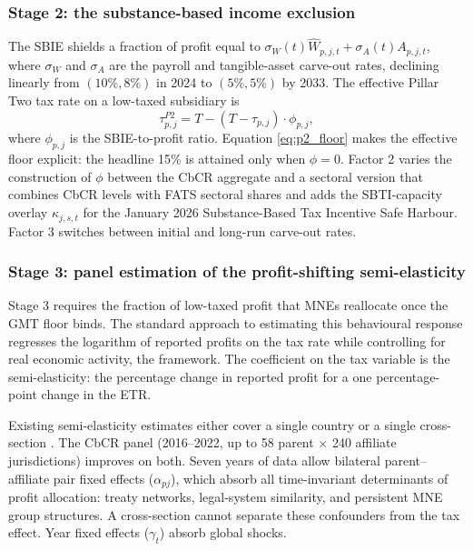 \documentclass[11pt,a4paper]{article}
\begin{document}
\subsubsection{Stage 2: the substance-based income exclusion}\label{sec:stage2}

The SBIE shields a fraction of profit equal to $\sigma_W(t) \hat{W}_{p,j,t} + \sigma_A(t) A_{p,j,t}$, where $\sigma_W$ and $\sigma_A$ are the payroll and tangible-asset carve-out rates, declining linearly from $(10\%, 8\%)$ in 2024 to $(5\%, 5\%)$ by 2033. The effective Pillar Two tax rate on a low-taxed subsidiary is
\begin{equation}\label{eq:p2_floor}
\tau_{p,j}^{P2} = T - (T - \tau_{p,j}) \cdot \phi_{p,j},
\end{equation}
where $\phi_{p,j}$ is the SBIE-to-profit ratio. Equation \eqref{eq:p2_floor} makes the effective floor explicit: the headline 15\% is attained only when $\phi = 0$. Factor 2 varies the construction of $\phi$ between the CbCR aggregate and a sectoral version that combines CbCR levels with FATS sectoral shares and adds the SBTI-capacity overlay $\kappa_{j,s,t}$ for the January 2026 Substance-Based Tax Incentive Safe Harbour. Factor 3 switches between initial and long-run carve-out rates.

\subsubsection{Stage 3: panel estimation of the profit-shifting semi-elasticity}\label{sec:estimation}

Stage 3 requires the fraction of low-taxed profit that MNEs reallocate once the GMT floor binds. The standard approach to estimating this behavioural response regresses the logarithm of reported profits on the tax rate while controlling for real economic activity, the \citet{hines1994} framework. The coefficient on the tax variable is the semi-elasticity: the percentage change in reported profit for a one percentage-point change in the ETR.

Existing semi-elasticity estimates either cover a single country \citep{dowd2017} or a single cross-section \citep{garcia-bernardo2024}. The CbCR panel (2016--2022, up to 58 parent $\times$ 240 affiliate jurisdictions) improves on both. Seven years of data allow bilateral parent--affiliate pair fixed effects ($\alpha_{pj}$), which absorb all time-invariant determinants of profit allocation: treaty networks, legal-system similarity, and persistent MNE group structures. A cross-section cannot separate these confounders from the tax effect. Year fixed effects ($\gamma_t$) absorb global shocks.
\end{document}
